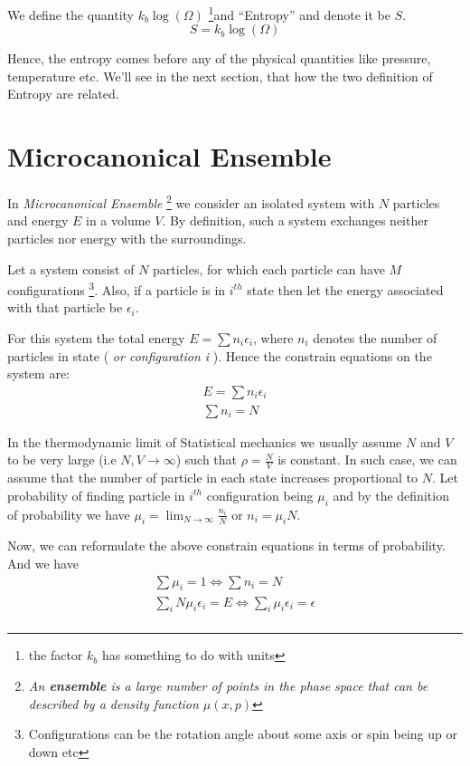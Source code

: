\documentclass{tufte-handout}
\begin{document}
We define the quantity \(k_b\log(\Omega)\) \footnote{the factor \(k_b\) has something to do 
with units}and ``Entropy'' and denote it be \(S\).  
\[S = k_b\log(\Omega)\]

Hence, the entropy comes before any of the physical quantities like pressure, temperature etc. 
We'll see in the next section, that how the two definition of Entropy are related.

\section{Microcanonical Ensemble} 



In \textit{Microcanonical Ensemble} \footnote{\textit{An \textbf{ensemble} is a large number of points in the phase space that can be described 
by a density function 
\(\mu (x, p)\)}} we consider an isolated system with \(N\) 
particles and energy \(E\) in a volume  
\(V\). By definition, such a system exchanges neither particles nor energy with the surroundings.

Let a system consist of {\(N\) particles}, for which each particle can have \(M\) configurations 
\footnote{Configurations can be the rotation angle about some axis or spin being up or down etc}.
Also, if a particle is in \(i^{th}\) state then 
let the energy associated with that particle be \(\epsilon _i\).  

For this system the total energy  
\(E = \sum n_i \epsilon_i\), where \(n_i\) denotes the number of particles in state (\textit{
	 or configuration i
}). Hence the constrain equations on the system are:
\[\begin{gathered}
	E = \sum n_i \epsilon_i\\
	\sum n_i = N
\end{gathered}\]

In the thermodynamic limit of Statistical mechanics we usually assume \(N\) and \(V\) to be very large
(i.e \(N, V \to \infty\)) 
such that \(\rho = \frac{N}{V}\) is constant. In such case, we can assume that the number of particle
in each state increases proportional to \(N\). Let probability
of finding particle in \(i^{th}\) configuration being \(\mu_i\) and by the definition of probability
 we have \(\mu_i = \lim_{N \to \infty} \frac{n_i}{N}\) or \(n_i = \mu_i N\). 

 Now, we can reformulate the above constrain equations in terms of probability. And we have 
 \[\begin{gathered}
	 \sum \mu_i = 1 \Longleftrightarrow \sum n_i = N\tag*{1}\\
	 \sum_i N\mu_i \epsilon_i = E \Longleftrightarrow  \sum_i \mu_i \epsilon_i = \epsilon \\
 \end{gathered}\]
\end{document}
